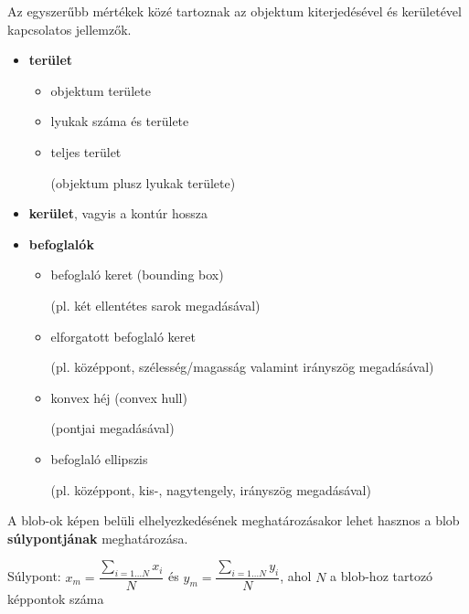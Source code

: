 \bigskip

Az egyszerűbb mértékek közé tartoznak az objektum kiterjedésével és kerületével kapcsolatos jellemzők.

\begin{itemize}
  \item \textbf{terület}
    \begin{itemize}
      \item objektum területe
      \item lyukak száma és területe
      \item teljes terület \\ \begin{small}(objektum plusz lyukak területe)\end{small}
    \end{itemize}
  \item \textbf{kerület}, vagyis a kontúr hossza
  \item \textbf{befoglalók}
    \begin{itemize}
      \item befoglaló keret (bounding box) \\ \begin{small}(pl. két ellentétes sarok megadásával)\end{small}
      \item elforgatott befoglaló keret \\ \begin{small}(pl. középpont, szélesség/magasság valamint irányszög megadásával)\end{small}
      \item konvex héj (convex hull) \\ \begin{small}(pontjai megadásával)\end{small}
      \item befoglaló ellipszis \\ \begin{small}(pl. középpont, kis-, nagytengely, irányszög megadásával)\end{small}
    \end{itemize}
\end{itemize}

\bigskip

A blob-ok képen belüli elhelyezkedésének meghatározásakor lehet hasznos a blob \textbf{súlypontjának} meghatározása.

\begin{definition}{Súlypont:}
$x_m = \dfrac{\sum_{i=1 \dots N} x_i}{N}$ és $y_m = \dfrac{\sum_{i=1 \dots N} y_i}{N}$, ahol $N$ a blob-hoz tartozó képpontok száma
\end{definition}


